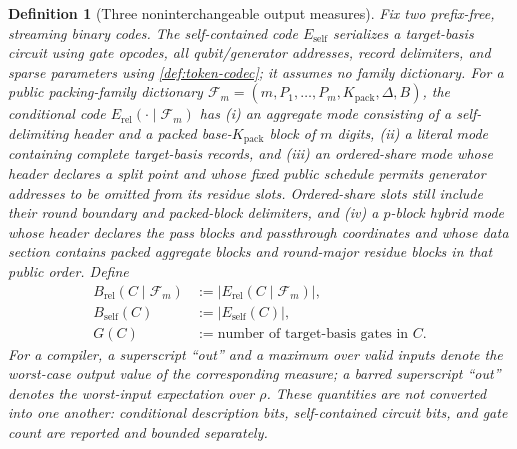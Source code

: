 \documentclass[aps,prx,reprint,floatfix,superscriptaddress]{revtex4-2}
\newtheorem{definition}{Definition}
\begin{document}
\begin{definition}[Three noninterchangeable output measures]
\label{def:info-budget-bits}
Fix two prefix-free, streaming binary codes.  The self-contained code
$E_{\mathrm{self}}$ serializes a target-basis circuit using gate opcodes,
all qubit/generator addresses, record delimiters, and sparse parameters
using \cref{def:token-codec}; it assumes no family dictionary.  For a public
packing-family dictionary
$\mathcal F_m=(m,P_1,\ldots,P_m,K_{\mathrm{pack}},\Delta,B)$, the conditional code
$E_{\mathrm{rel}}(\cdot\mid\mathcal F_m)$ has (i) an aggregate mode
consisting of a self-delimiting header and a packed
base-$K_{\mathrm{pack}}$ block of $m$
digits, (ii) a literal mode containing complete target-basis records, and
    (iii) an ordered-share mode whose header declares a split point and whose
fixed public schedule permits generator addresses to be omitted from its
residue slots.  Ordered-share slots still include their round boundary and
packed-block delimiters, and (iv) a $p$-block hybrid mode whose header
declares the pass blocks and passthrough coordinates and whose data section
contains packed aggregate blocks and round-major residue blocks in that
public order.  Define
\begin{equation}\label{eq:Bout-def}
\begin{aligned}
 B_{\mathrm{rel}}(C\mid\mathcal F_m)
 &:=|E_{\mathrm{rel}}(C\mid\mathcal F_m)|,\\
 B_{\mathrm{self}}(C)&:=|E_{\mathrm{self}}(C)|,\\
 G(C)&:=\text{number of target-basis gates in }C.
\end{aligned}
\end{equation}
For a compiler, a superscript ``out'' and a maximum over valid inputs denote
the worst-case output value of the corresponding measure; a barred
superscript ``out'' denotes the worst-input expectation over $\rho$.  These quantities
are not converted into one another: conditional description bits,
self-contained circuit bits, and gate count are reported and bounded
separately.
\end{definition}


\end{document}
